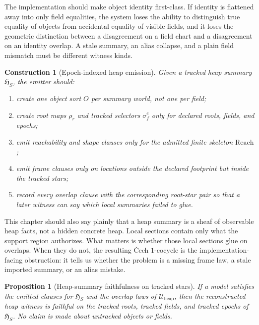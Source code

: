 \documentclass[11pt]{report}
\newtheorem{proposition}[definition]{Proposition}
\newtheorem{construction}[definition]{Construction}
\begin{document}
The implementation should make object identity first-class. If identity is flattened away into only field equalities, the system loses the ability to distinguish true equality of objects from accidental equality of visible fields, and it loses the geometric distinction between a disagreement on a field chart and a disagreement on an identity overlap. A stale summary, an alias collapse, and a plain field mismatch must be different witness kinds.

\begin{construction}[Epoch-indexed heap emission]
Given a tracked heap summary $\mathfrak{H}_{S}$, the emitter should:
\begin{enumerate}
\item create one object sort $O$ per summary world, not one per field;
\item create root maps $\rho_r$ and tracked selectors $\sigma_f^e$ only for declared roots, fields, and epochs;
\item emit reachability and shape clauses only for the admitted finite skeleton $\mathrm{Reach}$;
\item emit frame clauses only on locations outside the declared footprint but inside the tracked stars;
\item record every overlap clause with the corresponding root-star pair so that a later witness can say which local summaries failed to glue.
\end{enumerate}
\end{construction}

This chapter should also say plainly that a heap summary is a sheaf of observable heap facts, not a hidden concrete heap. Local sections contain only what the support region authorizes. What matters is whether those local sections glue on overlaps. When they do not, the resulting \v{C}ech $1$-cocycle is the implementation-facing obstruction: it tells us whether the problem is a missing frame law, a stale imported summary, or an alias mistake.

\begin{proposition}[Heap-summary faithfulness on tracked stars]
If a model satisfies the emitted clauses for $\mathfrak{H}_{S}$ and the overlap laws of $\mathcal{U}_{\mathrm{heap}}$, then the reconstructed heap witness is faithful on the tracked roots, tracked fields, and tracked epochs of $\mathfrak{H}_{S}$. No claim is made about untracked objects or fields.
\end{proposition}
\end{document}
